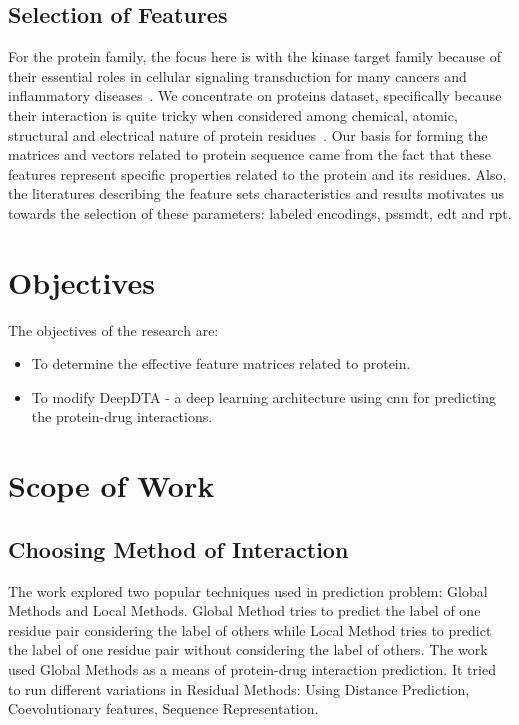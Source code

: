 \subsection{Selection of Features}

For the protein family, the focus here is with the kinase target family because of their essential roles in cellular signaling transduction for many cancers and inflammatory diseases~\citep{Tang2013,Kanehisa2000}. We concentrate on proteins dataset, specifically because their interaction is quite tricky when considered among chemical, atomic, structural and electrical nature of protein residues~\citep{Mathai2019}. Our basis for forming the matrices and vectors related to protein sequence came from the fact that these features represent specific properties related to the protein and its residues. Also, the literatures describing the feature sets characteristics and results motivates us towards the selection of these parameters: labeled encodings, \acrshort{pssmdt}, \acrshort{edt} and \acrshort{rpt}.


\section{Objectives}
The objectives of the research are:
\begin{itemize}
    \setlength\parindent{36pt}
    \item To determine the effective feature matrices related to protein.
    \item To modify DeepDTA - a deep learning architecture using \acrfull{cnn} for predicting the protein-drug interactions.
\end{itemize}

\section{Scope of Work}


\subsection{Choosing Method of Interaction}
The work explored two popular techniques used in prediction problem: Global Methods and Local Methods. Global Method tries to predict the label of one residue pair considering the label of others while Local Method tries to predict the label of one residue pair without considering the label of others. The work used Global Methods as a means of protein-drug interaction prediction. It tried to run different variations in Residual Methods: Using Distance Prediction, Coevolutionary features, Sequence Representation. 

